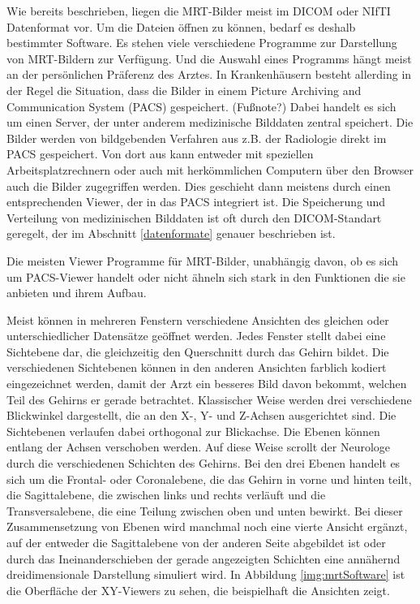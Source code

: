 Wie bereits beschrieben, liegen die MRT-Bilder meist im DICOM oder NIfTI Datenformat vor. Um die Dateien öffnen zu können, bedarf es deshalb bestimmter Software. Es stehen viele verschiedene Programme zur Darstellung von MRT-Bildern zur Verfügung. Und die Auswahl eines Programms hängt meist an der persönlichen Präferenz des Arztes. 
In Krankenhäusern besteht allerding in der Regel die Situation, dass die Bilder in einem Picture Archiving and Communication System (PACS) gespeichert. (Fußnote?) Dabei handelt es sich um einen Server, der unter anderem medizinische Bilddaten zentral speichert. Die Bilder werden von bildgebenden Verfahren aus z.B. der Radiologie direkt im PACS gespeichert. Von dort aus kann entweder mit speziellen Arbeitsplatzrechnern oder auch mit herkömmlichen Computern über den Browser auch die Bilder zugegriffen werden. Dies geschieht dann meistens durch einen entsprechenden Viewer, der in das PACS integriert ist. Die Speicherung und Verteilung von medizinischen Bilddaten ist oft durch den DICOM-Standart geregelt, der im Abschnitt \ref{datenformate} genauer beschrieben ist.

Die meisten Viewer Programme für MRT-Bilder, unabhängig davon, ob es sich um PACS-Viewer handelt oder nicht ähneln sich stark in den Funktionen die sie anbieten und ihrem Aufbau.

Meist können in mehreren Fenstern verschiedene Ansichten des gleichen oder unterschiedlicher Datensätze geöffnet werden. Jedes Fenster stellt dabei eine Sichtebene dar, die gleichzeitig den Querschnitt durch das Gehirn bildet. Die verschiedenen Sichtebenen können in den anderen Ansichten farblich kodiert eingezeichnet werden, damit der Arzt ein besseres Bild davon bekommt, welchen Teil des Gehirns er gerade betrachtet.
Klassischer Weise werden drei verschiedene Blickwinkel dargestellt, die an den X-, Y- und Z-Achsen ausgerichtet sind. Die Sichtebenen verlaufen dabei orthogonal zur Blickachse. Die Ebenen können entlang der Achsen verschoben werden. Auf diese Weise scrollt der Neurologe durch die verschiedenen Schichten des Gehirns. 
Bei den drei Ebenen handelt es sich um die Frontal- oder Coronalebene, die das Gehirn in vorne und hinten teilt, die Sagittalebene, die zwischen links und rechts verläuft und die Transversalebene, die eine Teilung zwischen oben und unten bewirkt.  
Bei dieser Zusammensetzung von Ebenen wird manchmal noch eine vierte Ansicht ergänzt, auf der entweder die Sagittalebene von der anderen Seite abgebildet ist oder durch das Ineinanderschieben der gerade angezeigten Schichten eine annähernd dreidimensionale Darstellung simuliert wird. 
In Abbildung \ref{img:mrtSoftware} ist die Oberfläche der XY-Viewers zu sehen, die beispielhaft die Ansichten zeigt.


